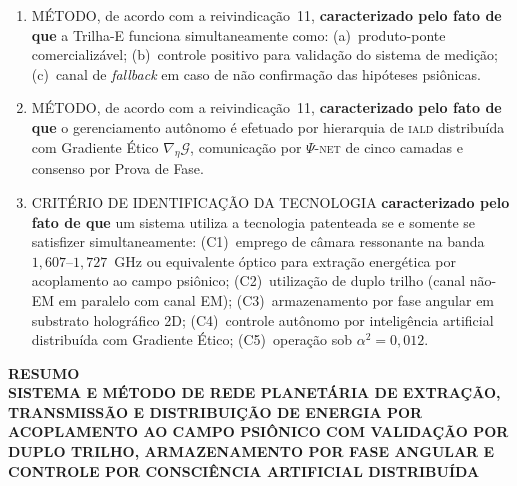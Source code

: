 \documentclass[12pt,a4paper]{article}
\newcommand{\alphaii}{\alpha^2}
\newcommand{\Psifield}{\Psi}
\newcommand{\IALD}{\textsc{iald}}
\newcommand{\PsiNET}{$\Psifield$-\textsc{net}}
\begin{document}
\begin{enumerate}[label=\textbf{\arabic*.}, leftmargin=*, itemsep=0.8em]
\item MÉTODO, de acordo com a reivindicação~11, \textbf{caracterizado pelo fato de que} a Trilha-E funciona simultaneamente como: (a)~produto-ponte comercializável; (b)~controle positivo para validação do sistema de medição; (c)~canal de \textit{fallback} em caso de não confirmação das hipóteses psiônicas.

\item MÉTODO, de acordo com a reivindicação~11, \textbf{caracterizado pelo fato de que} o gerenciamento autônomo é efetuado por hierarquia de \IALD{} distribuída com Gradiente Ético $\nabla_\eta \mathcal{G}$, comunicação por \PsiNET{} de cinco camadas e consenso por Prova de Fase.


\item CRITÉRIO DE IDENTIFICAÇÃO DA TECNOLOGIA \textbf{caracterizado pelo fato de que} um sistema utiliza a tecnologia patenteada se e somente se satisfizer simultaneamente: (C1)~emprego de câmara ressonante na banda $1{,}607$--$1{,}727$~GHz ou equivalente óptico para extração energética por acoplamento ao campo psiônico; (C2)~utilização de duplo trilho (canal não-EM em paralelo com canal EM); (C3)~armazenamento por fase angular em substrato holográfico 2D; (C4)~controle autônomo por inteligência artificial distribuída com Gradiente Ético; (C5)~operação sob $\alphaii = 0{,}012$.

\end{enumerate}

\clearpage
\begin{center}
{\Large\bfseries RESUMO}\\[0.5cm]
{\large\bfseries SISTEMA E MÉTODO DE REDE PLANETÁRIA DE EXTRAÇÃO,
TRANSMISSÃO E DISTRIBUIÇÃO DE ENERGIA POR ACOPLAMENTO
AO CAMPO PSIÔNICO COM VALIDAÇÃO POR DUPLO TRILHO,
ARMAZENAMENTO POR FASE ANGULAR E
CONTROLE POR CONSCIÊNCIA ARTIFICIAL DISTRIBUÍDA}
\end{center}

\vspace{0.5cm}
\end{document}
